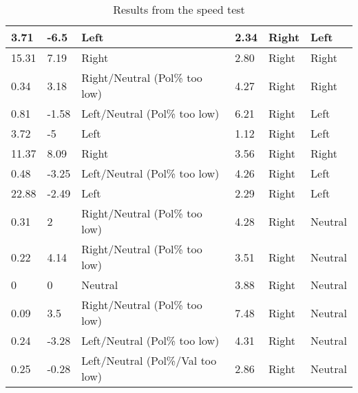 \begin{table}[H]
\begin{tabular}{|l|l|l|l|l|l|}
3.71	&	-6.5	&	Left								&	2.34	&	Right		&	Left	\\\hline
15.31	&	7.19	&	Right								&	2.80	&	Right		&	Right	\\\hline
0.34	&	3.18	&	Right/Neutral (Pol\% too low)		&	4.27	&	Right		&	Right	\\\hline
0.81	&	-1.58	&	Left/Neutral (Pol\% too low)		&	6.21	&	Right		&	Left	\\\hline
3.72	&	-5		&	Left								&	1.12	&	Right		&	Left	\\\hline
11.37	&	8.09	&	Right								&	3.56	&	Right		&	Right	\\\hline
0.48	&	-3.25	&	Left/Neutral (Pol\% too low)		&	4.26	&	Right		&	Left	\\\hline
22.88	&	-2.49	&	Left								&	2.29	&	Right		&	Left	\\\hline
0.31	&	2		&	Right/Neutral (Pol\% too low)		&	4.28	&	Right		&	Neutral	\\\hline
0.22	&	4.14	&	Right/Neutral (Pol\% too low)		&	3.51	&	Right		&	Neutral	\\\hline
0		&	0		&	Neutral								&	3.88	&	Right		&	Neutral	\\\hline
0.09	&	3.5		&	Right/Neutral (Pol\% too low)		&	7.48	&	Right		&	Neutral	\\\hline
0.24	&	-3.28	&	Left/Neutral (Pol\% too low)		&	4.31	&	Right		&	Neutral	\\\hline
0.25	&	-0.28	&	Left/Neutral (Pol\%/Val too low)	&	2.86	&	Right		&	Neutral	\\\hline

\end{tabular}
\caption{Results from the speed test}
\label{speedTestRes}
\end{table}